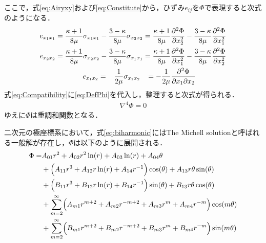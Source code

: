 ここで，式\eqref{eq:Airyxy}および\eqref{eq:Constitute}から，ひずみ$e_{ij}$を$\Phi$で表現すると次式のようになる．
\begin{align}
	e_{x_{1}x_{1}}=\frac{\kappa+1}{8\mu}\sigma_{x_{1}x_{1}}-\frac{3-\kappa}{8\mu}\sigma_{x_{2}x_{2}}
	=\frac{\kappa+1}{8\mu}\frac{\partial^2 \Phi}{\partial x_{2}^2}-\frac{3-\kappa}{8\mu}\frac{\partial^2 \Phi}{\partial x_{1}^2}
	\nonumber
	\\
	e_{x_{2}x_{2}}=\frac{\kappa+1}{8\mu}\sigma_{x_{2}x_{2}}-\frac{3-\kappa}{8\mu}\sigma_{x_{1}x_{1}}
	=\frac{\kappa+1}{8\mu}\frac{\partial^2 \Phi}{\partial x_{1}^2}-\frac{3-\kappa}{8\mu}\frac{\partial^2 \Phi}{\partial x_{2}^2}
	\nonumber
	\\
	e_{x_{1}x_{2}}=\hspace{0.3cm}\frac{1}{2\mu}\sigma_{x_{1}x_{2}}\hspace{0.3cm}
	=-\frac{1}{2\mu}\frac{\partial^2 \Phi}{\partial x_{1} \partial x_{2}}\hspace{1.5cm}
	\label{eq:DefPhi}
\end{align}
式\eqref{eq:Compatibility}に\eqref{eq:DefPhi}を代入し，整理すると次式が得られる．
\begin{align}
	\nabla^4\Phi=0
	\label{eq:biharmonic}
\end{align}
ゆえに$\Phi$は重調和関数となる．

二次元の極座標系において，式\eqref{eq:biharmonic}にはThe Michell solutionと呼ばれる一般解が存在し，$\Phi$は以下のように展開される．
\begin{align}
	\Phi =&A_{01}r^2+A_{02}r^2\ln(r)+A_{03}\ln(r)+A_{04}\theta
	\nonumber
	\\
	&+\Bigl(A_{11}r^3+A_{12}r\ln(r)+A_{14}r^{-1}\Bigr)\cos(\theta)+A_{13}r\theta\sin(\theta)
	\nonumber
	\\
	&+\Bigl(B_{11}r^3+B_{12}r\ln(r)+B_{14}r^{-1}\Bigr)\sin(\theta)+B_{13}r\theta\cos(\theta)
	\nonumber
	\\
	&+\sum_{m=2}^{\infty}\Bigl(A_{m1}r^{m+2}+A_{m2}r^{-m+2}
	+A_{m3}r^{m}+A_{m4}r^{-m}\Bigr)\cos(m\theta)
	\nonumber
	\\
	&+\sum_{m=2}^{\infty}\Bigl(B_{m1}r^{m+2}+B_{m2}r^{-m+2}
	+B_{m3}r^{m}+B_{m4}r^{-m}\Bigr)\sin(m\theta)
	\label{eq:Michell}
\end{align}


